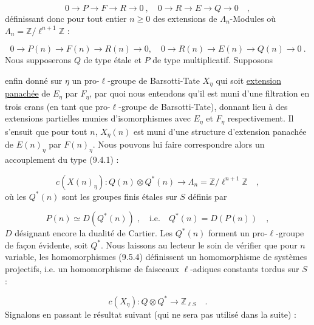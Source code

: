 \begin{equation}\tag{9.5.2}
0 \longrightarrow P \longrightarrow F \longrightarrow R \longrightarrow 0 \ , \quad 0 \longrightarrow R \longrightarrow E \longrightarrow Q \longrightarrow 0 \quad ,
\end{equation}
définissant donc pour tout entier $n \geq 0$ des extensions de $\Lambda_n$-Modules où $\Lambda_n = \mathbb{Z}/\ell^{n+1}\mathbb{Z}$ :

\begin{equation}\tag{9.5.3}
0 \longrightarrow P(n) \longrightarrow F(n) \longrightarrow R(n) \longrightarrow 0, \quad 0 \longrightarrow R(n) \longrightarrow E(n) \longrightarrow Q(n) \longrightarrow 0 \ .
\end{equation}
Nous supposerons $Q$ de type étale et $P$ de type multiplicatif. Supposons



enfin donné sur $\eta$ un pro-$\ell$-groupe de Barsotti-Tate $X_\eta$ qui soit \underline{extension panachée} de $E_\eta$ par $F_\eta$, par quoi nous entendons qu'il est muni d'une filtration en trois crans (en tant que pro-$\ell$-groupe de Barsotti-Tate), donnant lieu à des extensions partielles munies d'isomorphismes avec $E_\eta$ et $F_\eta$ respectivement. Il s'ensuit que pour tout $n$, $X_\eta(n)$ est muni d'une structure d'extension panachée de $E(n)_\eta$ par $F(n)_\eta$. Nous pouvons lui faire correspondre alors un accouplement du type (9.4.1) :

\begin{equation}\tag{9.5.4}
c(X(n)_\eta) : Q(n) \otimes Q^*(n) \longrightarrow \Lambda_n = \mathbb{Z}/\ell^{n+1}\mathbb{Z} \quad ,
\end{equation}
où les $Q^*(n)$ sont les groupes finis étales sur $S$ définis par

\begin{equation*}
P(n) \simeq D(Q^*(n)) \; , \quad \mathrm{i.e.} \quad Q^*(n) = D(P(n)) \quad ,
\end{equation*}
$D$ désignant encore la dualité de Cartier. Les $Q^*(n)$ forment un pro-$\ell$-groupe de façon évidente, soit $Q^*$. Nous laissons au lecteur le soin de vérifier que pour $n$ variable, les homomorphismes (9.5.4) définissent un homomorphisme de systèmes projectifs, i.e. un homomorphisme de faisceaux $\ell$-adiques constants tordus sur $S$ :

\begin{equation}\tag{9.5.5}
c(X_\eta) : Q \otimes Q^* \longrightarrow \mathbb{Z}_{\ell S} \quad .
\end{equation}
Signalons en passant le résultat suivant (qui ne sera pas utilisé dans la suite) :

